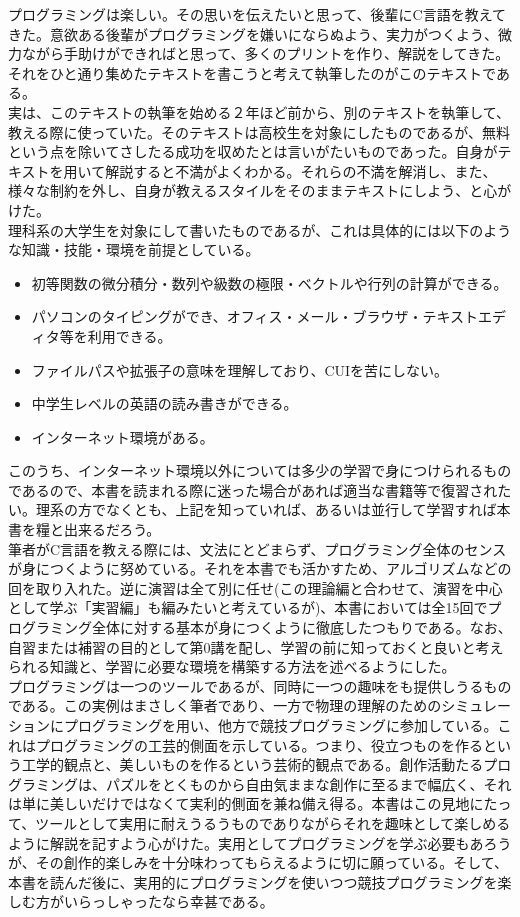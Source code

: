 プログラミングは楽しい。その思いを伝えたいと思って、後輩にC言語を教えてきた。意欲ある後輩がプログラミングを嫌いにならぬよう、実力がつくよう、微力ながら手助けができればと思って、多くのプリントを作り、解説をしてきた。それをひと通り集めたテキストを書こうと考えて執筆したのがこのテキストである。\\

実は、このテキストの執筆を始める２年ほど前から、別のテキストを執筆して、教える際に使っていた。そのテキストは高校生を対象にしたものであるが、無料という点を除いてさしたる成功を収めたとは言いがたいものであった。自身がテキストを用いて解説すると不満がよくわかる。それらの不満を解消し、また、様々な制約を外し、自身が教えるスタイルをそのままテキストにしよう、と心がけた。\\

理科系の大学生を対象にして書いたものであるが、これは具体的には以下のような知識・技能・環境を前提としている。
\begin{itemize}
\item 初等関数の微分積分・数列や級数の極限・ベクトルや行列の計算ができる。
\item パソコンのタイピングができ、オフィス・メール・ブラウザ・テキストエディタ等を利用できる。
\item ファイルパスや拡張子の意味を理解しており、CUIを苦にしない。
\item 中学生レベルの英語の読み書きができる。
\item インターネット環境がある。
\end{itemize}
このうち、インターネット環境以外については多少の学習で身につけられるものであるので、本書を読まれる際に迷った場合があれば適当な書籍等で復習されたい。理系の方でなくとも、上記を知っていれば、あるいは並行して学習すれば本書を糧と出来るだろう。\\

筆者がC言語を教える際には、文法にとどまらず、プログラミング全体のセンスが身につくように努めている。それを本書でも活かすため、アルゴリズムなどの回を取り入れた。逆に演習は全て別に任せ(この理論編と合わせて、演習を中心として学ぶ「実習編」も編みたいと考えているが)、本書においては全15回でプログラミング全体に対する基本が身につくように徹底したつもりである。なお、自習または補習の目的として第0講を配し、学習の前に知っておくと良いと考えられる知識と、学習に必要な環境を構築する方法を述べるようにした。\\

プログラミングは一つのツールであるが、同時に一つの趣味をも提供しうるものである。この実例はまさしく筆者であり、一方で物理の理解のためのシミュレーションにプログラミングを用い、他方で競技プログラミングに参加している。これはプログラミングの工芸的側面を示している。つまり、役立つものを作るという工学的観点と、美しいものを作るという芸術的観点である。創作活動たるプログラミングは、パズルをとくものから自由気ままな創作に至るまで幅広く、それは単に美しいだけではなくて実利的側面を兼ね備え得る。本書はこの見地にたって、ツールとして実用に耐えうるうものでありながらそれを趣味として楽しめるように解説を記すよう心がけた。実用としてプログラミングを学ぶ必要もあろうが、その創作的楽しみを十分味わってもらえるように切に願っている。そして、本書を読んだ後に、実用的にプログラミングを使いつつ競技プログラミングを楽しむ方がいらっしゃったなら幸甚である。\\


